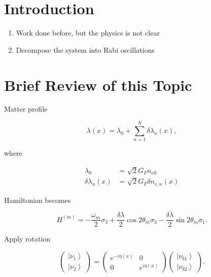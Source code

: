 \documentclass[%
preprint,
 amsmath,amssymb,
 aps,
]{revtex4-1}
\newcommand{\ket}[1]{\left| #1\right\rangle}
\begin{document}

\section{\label{introduction}Introduction}

\begin{enumerate}
    \item Work done before, but the physics is not clear
    \item Decompose the system into Rabi oscillations
\end{enumerate}


\section{\label{review}Brief Review of this Topic}


Matter profile

\begin{equation}
    \lambda(x) = \lambda_0 + \sum_{n=1}^{N} \delta \lambda_n (x),
\end{equation}

where

\begin{align}
    \lambda_0 &= \sqrt{2}G_F n_{e0} \\
    \delta \lambda_n(x) &= \sqrt{2}G_F \delta n_{e,n}(x)
\end{align}


Hamiltonian becomes

\begin{equation}
    H^{(m)} = - \frac{\omega_m}{2} \sigma_3 + \frac{\delta \lambda}{2} \cos 2\theta_m \sigma_3 - \frac{\delta \lambda}{2} \sin 2 \theta_m \sigma_1.
\end{equation}

Apply rotation


\begin{equation}
\begin{pmatrix} \ket{\nu_1} \\ \ket{\nu_2} \end{pmatrix} = \begin{pmatrix} e^{-i \eta (x)} & 0 \\  0 & e^{i \eta (x)}  \end{pmatrix} \begin{pmatrix} \ket{\nu_{b1}} \\ \ket{\nu_{b2}} \end{pmatrix}.
\end{equation}
\end{document}
